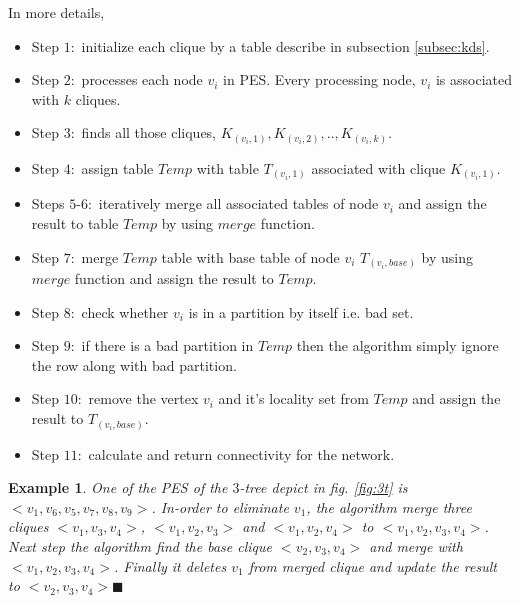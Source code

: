 \documentclass[12pt]{article}
\newtheorem{exmp}{Example}[section]
\begin{document}
In more details, 
\begin{itemize}[noitemsep,nolistsep]
\item   Step $1:$ initialize each clique by a table describe in subsection \ref{subsec:kds}.
\item Step $2:$ processes each node $v_i$ in PES. Every processing node, $v_i$ is associated with $k$ cliques.
\item Step $3:$ finds all those cliques,
 $K_{(v_i,1)},K_{(v_i,2)},..,K_{(v_i,k)}$. 
 \item Step $4:$ assign table $Temp$ with table  $T_{(v_i,1)}$ associated with clique  $K_{(v_i,1)}$.
 \item Steps $5$-$6:$ iteratively merge all associated tables of node $v_i$ and assign the result to table $Temp$ by using $merge$ function. \item Step $7:$ merge $Temp$ table with base table of node $v_i$ $T_{(v_i,base)}$ by using $merge$ function and assign the result to $Temp$. 
 \item Step $8:$ check whether $v_i$ is in a partition by itself i.e. bad set. 
 \item Step $9:$ if there is a bad partition in $Temp$ then the algorithm simply ignore the row along with bad partition.
 \item Step $10:$ remove the vertex $v_i$ and it's locality set from $Temp$ and assign the result to $T_{(v_i,base)}$.
 \item Step $11:$ calculate and return connectivity for the network.
 \end{itemize}
\begin{exmp}
\normalfont
 One of the PES of the $3$-tree depict in fig. \ref{fig:3t} is $<v_1,v_6,v_5,v_7,v_8, v_9>$. In-order to eliminate $v_1$, the algorithm  merge three cliques $<v_1,v_3,v_4>$, $<v_1,v_2,v_3>$ and $<v_1,v_2,v_4>$ to $<v_1,v_2,v_3,v_4>$. Next step the algorithm find the base clique $<v_2,v_3,v_4>$ and merge with  $<v_1,v_2,v_3,v_4>$. Finally it deletes $v_1$  from merged clique and update the result to $<v_2,v_3,v_4> \blacksquare$
\end{exmp}
\end{document}
